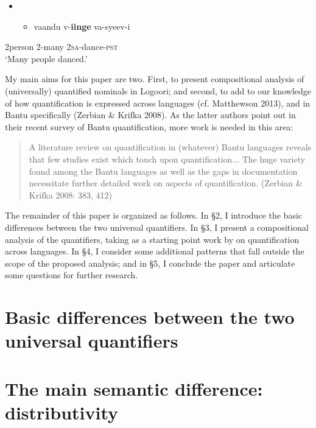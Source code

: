 \documentclass[output=paper]{langsci/langscibook}
\begin{document}
\begin{itemize}
\item \setcounter{itemize}{0}
\begin{itemize}
\item \gll vaandu  v-\textbf{iinge}  va-syeev-i\\
\end{itemize}
\end{itemize}
     2person  2-many  2\textsc{sa}{}-dance-\textsc{pst}\\
\glt ‘Many people danced.’\\

\z

  My main aims for this paper are two. First, to present compositional analysis of (universally) quantified nominals in Logoori; and second, to add to our knowledge of how quantification is expressed across languages (cf. Matthewson 2013), and in Bantu specifically (Zerbian \& Krifka 2008). As the latter authors point out in their recent survey of Bantu quantification, more work is needed in this area:

\begin{quote}
A literature review on quantification in (whatever) Bantu languages reveals that few studies exist which touch upon quantification... The huge variety found among the Bantu languages as well as the gaps in documentation necessitate further detailed work on aspects of quantification. (Zerbian \& Krifka 2008: 383, 412) 
\end{quote}

  The remainder of this paper is organized as follows. In §2, I introduce the basic differences between the two universal quantifiers. In §3, I present a compositional analysis of the quantifiers, taking as a starting point work by \citet{Matthewson2013} on quantification across languages. In §4, I consider some additional patterns that fall outside the scope of the proposed analysis; and in §5, I conclude the paper and articulate some questions for further research.

\section{ Basic differences between the two universal quantifiers}

\section{The main semantic difference: distributivity }
\end{document}
